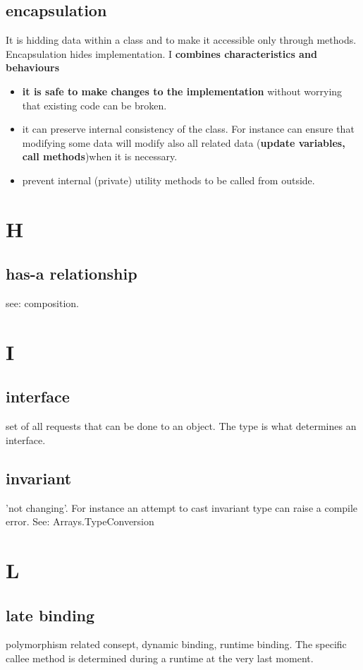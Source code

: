 \documentclass{report}
\begin{document}
\subsection{encapsulation}
It is hidding data within a class and to make it accessible only through methods. Encapsulation
hides implementation. I \textbf{combines characteristics and behaviours}
\begin{itemize}
	\item \textbf{it is safe to make changes to the implementation}
	without worrying that existing code can be broken.
	\item it can preserve internal consistency of the class. For instance can ensure that modifying some data
	will modify also all related data (\textbf{update variables, call methods})when it is necessary.
	\item prevent internal (private) utility methods to be called from outside.
\end{itemize}


\section{H}

\subsection{has-a relationship}
see: composition.


\section{I}

\subsection{interface}
set of all requests that can be done to an object. The type is what determines an interface.

\subsection{invariant}
'not changing'. For instance an attempt to cast invariant type can raise a compile error. See: Arrays.TypeConversion

\section{L}

\subsection{late binding}
polymorphism related consept, dynamic binding, runtime binding. The specific callee method is determined during a runtime at the very last moment.
\end{document}
